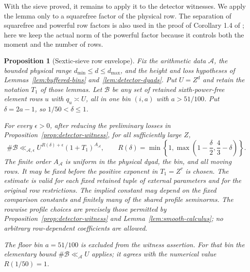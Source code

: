 \documentclass[11pt,a4paper]{article}
\numberwithin{equation}{section}
\numberwithin{figure}{section}
\newtheorem{proposition}[theorem]{Proposition}
\theoremstyle{definition}
\theoremstyle{remark}
\begin{document}
With the sieve proved, it remains to apply it to the detector witnesses.
We apply the lemma only to a squarefree factor of the physical row.  The
separation of squarefree and powerful row factors is also used in the
proof of Corollary 1.4 of \cite{BGL}; here we keep the actual norm of the
powerful factor because it controls both the moment and the number of rows.

\begin{proposition}[Sextic-sieve row envelope]\label{prop:sextic-row-count}
Fix the arithmetic data $\mathcal A$, the bounded physical range
$d_{\min}\le d\le d_{\max}$, and the height and loss hypotheses of
Lemmas~\ref{lem:buffered-bins} and~\ref{lem:detector-dyads}.  Put
$U=Z^d$ and retain the notation $T_1$ of those lemmas.  Let $\mathcal B$
be any set of retained sixth-power-free element rows $u$ with
$q_u\asymp U$, all in one bin $(i,a)$ with $a>51/100$.  Put
$\delta=2a-1$, so $1/50<\delta\le1$.

For every $\epsilon>0$, after reducing the preliminary losses in
Proposition~\ref{prop:detector-witness}, for all sufficiently large $Z$,
\begin{equation}\label{eq:sextic-row-count}
 \#\mathcal B\ll_{\mathcal A,\epsilon}
 U^{R(\delta)+\epsilon}(1+T_1)^{A_{\mathcal A}},
 \qquad
 R(\delta)=\min\left\{1,
       \max\left(1-\frac\delta2,\frac43-\delta\right)\right\}.
\end{equation}
The finite order $A_{\mathcal A}$ is uniform in the physical dyad, the bin,
and all moving rows.  It may be fixed before the positive exponent in
$T_1=Z^\tau$ is chosen.  The estimate is valid for each fixed retained
tuple of external parameters and for the original row restrictions.  The
implied constant may depend on the fixed comparison constants and finitely
many of the shared profile seminorms.  The rowwise profile choices are
precisely those permitted by
Proposition~\ref{prop:detector-witness} and
Lemma~\ref{lem:smooth-calculus}; no arbitrary row-dependent coefficients
are allowed.

The floor bin $a=51/100$ is excluded from the witness assertion.  For that
bin the elementary bound $\#\mathcal B\ll_{\mathcal A}U$ applies; it agrees
with the numerical value $R(1/50)=1$.
\end{proposition}
\end{document}
